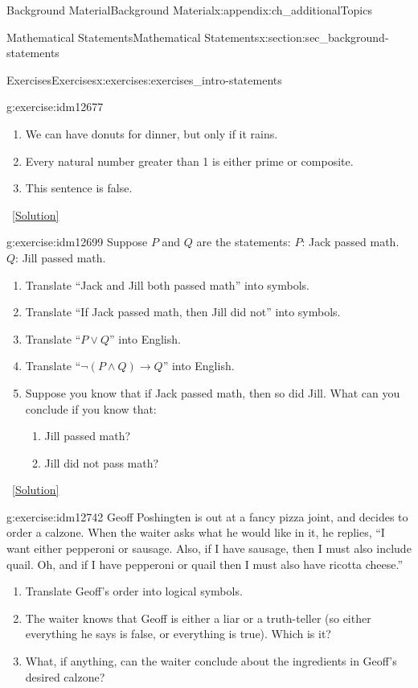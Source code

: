 \documentclass[oneside,10pt,]{book}
\numberwithin{equation}{chapter}
\def\imp{\rightarrow}
\begin{document}
\begin{appendixptx}{Background Material}{}{Background Material}{}{}{x:appendix:ch_additionalTopics}
\begin{sectionptx}{Mathematical Statements}{}{Mathematical Statements}{}{}{x:section:sec_background-statements}
\begin{exercises-subsection}{Exercises}{}{Exercises}{}{}{x:exercises:exercises_intro-statements}
\begin{divisionexercise}{1}{}{}{g:exercise:idm12677}
\begin{enumerate}[label=(\alph*)]
\item{}We can have donuts for dinner, but only if it rains.%
\item{}Every natural number greater than 1 is either prime or composite.%
\item{}This sentence is false.%
\end{enumerate}
%
\qquad~\hfill{\tiny\hyperlink{g:solution:idm12687-main}{[Solution]}}\end{divisionexercise}%
\begin{divisionexercise}{2}{}{}{g:exercise:idm12699}%
Suppose \(P\) and \(Q\) are the statements: \(P\): Jack passed math. \(Q\): Jill passed math.%
%
\begin{enumerate}[label=(\alph*)]
\item{}Translate ``Jack and Jill both passed math'' into symbols.%
\item{}Translate ``If Jack passed math, then Jill did not'' into symbols.%
\item{}Translate ``\(P \vee Q\)'' into English.%
\item{}Translate ``\(\neg(P \wedge Q) \imp Q\)'' into English.%
\item{}Suppose you know that if Jack passed math, then so did Jill.  What can you conclude if you know that:%
\begin{enumerate}[label=\roman*.]
\item{}Jill passed math?%
\item{}Jill did not pass math?%
\end{enumerate}
%
\end{enumerate}
\qquad~\hfill{\tiny\hyperlink{g:solution:idm12726-main}{[Solution]}}\end{divisionexercise}%
\begin{divisionexercise}{3}{}{}{g:exercise:idm12742}%
Geoff Poshingten is out at a fancy pizza joint, and decides to order a calzone. When the waiter asks what he would like in it, he replies, ``I want either pepperoni or sausage. Also, if I have sausage, then I must also include quail. Oh, and if I have pepperoni or quail then I must also have ricotta cheese.''%
%
\begin{enumerate}[label=(\alph*)]
\item{}Translate Geoff's order into logical symbols.%
\item{}The waiter knows that Geoff is either a liar or a truth-teller (so either everything he says is false, or everything is true).  Which is it?%
\item{}What, if anything, can the waiter conclude about the ingredients in Geoff's desired calzone?%

\end{enumerate}
\end{divisionexercise}
\end{exercises-subsection}
\end{sectionptx}
\end{appendixptx}
\end{document}

